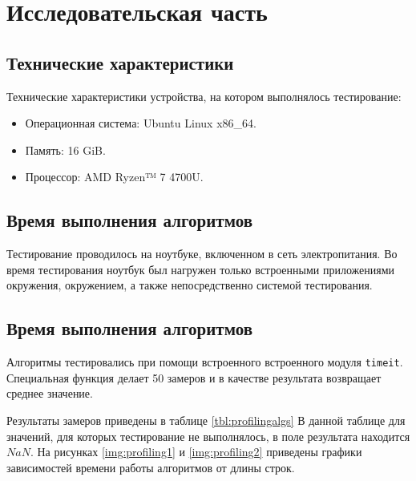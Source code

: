 \chapter{Исследовательская часть}

\section{Технические характеристики}

Технические характеристики устройства, на котором выполнялось тестирование:

\begin{itemize}
	\item Операционная система: Ubuntu\cite{ubuntu} Linux x86\_64.
	\item Память: 16 GiB.
	\item Процессор: AMD Ryzen™ 7 4700U\cite{amd}.
\end{itemize}

\section{Время выполнения алгоритмов}

Тестирование проводилось на ноутбуке, включенном в сеть электропитания. Во время тестирования ноутбук был нагружен только встроенными
приложениями окружения, окружением, а также непосредственно системой тестирования.

\section{Время выполнения алгоритмов}

Алгоритмы тестировались при помощи встроенного встроенного модуля \texttt{timeit}\cite{timeit}. Специальная функция делает 50 замеров и в качестве результата возвращает среднее значение.

Результаты замеров приведены в таблице \ref{tbl:profilingalgs} В данной таблице для значений, для которых тестирование не выполнялось, в поле результата находится $NaN$. На рисунках \ref{img:profiling1} и \ref{img:profiling2} приведены графики зависимостей времени работы алгоритмов от длины строк.


